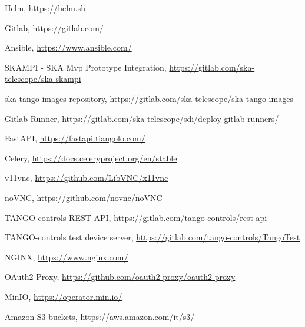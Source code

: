 \documentclass[a4paper,
               keeplastbox,   %
               ]{jacow}
\begin{document}
{\begin{thebibliography}{99}
		Helm,
		\url{https://helm.sh}

		Gitlab,
		\url{https://gitlab.com/}

		Ansible,
		\url{https://www.ansible.com/}

		SKAMPI - SKA Mvp Prototype Integration,
		\url{https://gitlab.com/ska-telescope/ska-skampi}

		ska-tango-images repository,
		\url{https://gitlab.com/ska-telescope/ska-tango-images}

		Gitlab Runner,
		\url{https://gitlab.com/ska-telescope/sdi/deploy-gitlab-runners/}
		
		FastAPI,
		\url{https://fastapi.tiangolo.com/}
	
		Celery,
		\url{https://docs.celeryproject.org/en/stable}
		
		v11vnc,
		\url{https://github.com/LibVNC/x11vnc}
		
		noVNC,
		\url{https://github.com/novnc/noVNC}
		
		TANGO-controls REST API,
		\url{https://gitlab.com/tango-controls/rest-api}
	
		TANGO-controls test device server,
		\url{https://gitlab.com/tango-controls/TangoTest}
		
		NGINX,
		\url{https://www.nginx.com/}
		
		OAuth2 Proxy,
		\url{https://github.com/oauth2-proxy/oauth2-proxy}
		
		MinIO,
		\url{https://operator.min.io/}
		
		Amazon S3 buckets,
		\url{https://aws.amazon.com/it/s3/}

	\end{thebibliography}
}
 
\end{document}
